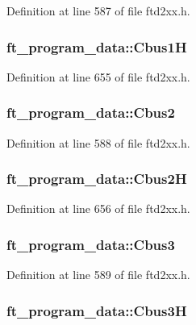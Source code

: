 Definition at line 587 of file ftd2xx.h.\hypertarget{structft__program__data_a6340d69327641cfac50d21459653a8be}{
\subsubsection[{Cbus1H}]{ {\bf ft\_\-program\_\-data::Cbus1H}}}
\label{structft__program__data_a6340d69327641cfac50d21459653a8be}


Definition at line 655 of file ftd2xx.h.\hypertarget{structft__program__data_aaae755cecc3a5badf8223e12782d37ad}{
\subsubsection[{Cbus2}]{ {\bf ft\_\-program\_\-data::Cbus2}}}
\label{structft__program__data_aaae755cecc3a5badf8223e12782d37ad}


Definition at line 588 of file ftd2xx.h.\hypertarget{structft__program__data_aeecd2d59d0a6cbf580e417896988046b}{
\subsubsection[{Cbus2H}]{ {\bf ft\_\-program\_\-data::Cbus2H}}}
\label{structft__program__data_aeecd2d59d0a6cbf580e417896988046b}


Definition at line 656 of file ftd2xx.h.\hypertarget{structft__program__data_aba7bece422de482b850ee83df8603f05}{
\subsubsection[{Cbus3}]{ {\bf ft\_\-program\_\-data::Cbus3}}}
\label{structft__program__data_aba7bece422de482b850ee83df8603f05}


Definition at line 589 of file ftd2xx.h.\hypertarget{structft__program__data_ae3df803a222da7e55590f14cb68b5a78}{
\subsubsection[{Cbus3H}]{ {\bf ft\_\-program\_\-data::Cbus3H}}}
\label{structft__program__data_ae3df803a222da7e55590f14cb68b5a78}


